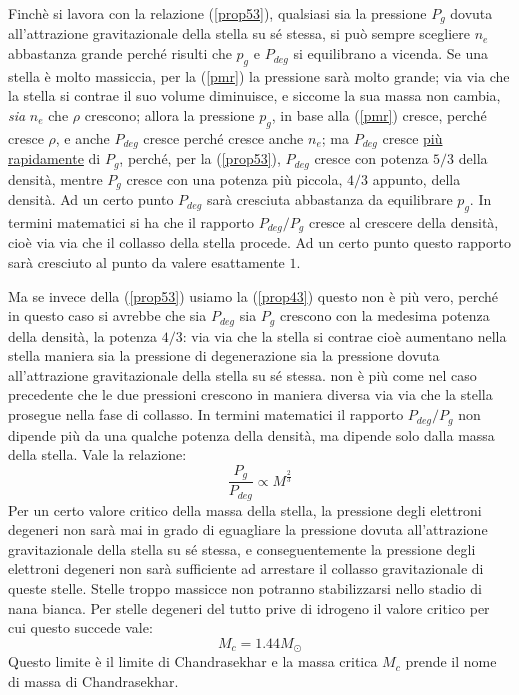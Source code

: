 Finch\`{e} si lavora con la relazione (\ref{prop53}), qualsiasi sia la pressione $P_{g}$ dovuta all'attrazione gravitazionale della stella su s\'{e} stessa, si pu\`{o} sempre scegliere $n_{e}$ abbastanza grande perch\'{e} risulti che $p_{g}$ e $P_{deg}$ si equilibrano a vicenda. Se una stella \`{e} molto massiccia, per la (\ref{pmr}) la pressione sar\`{a} molto grande; via via che la stella si contrae il suo volume diminuisce, e siccome la sua massa non cambia, \emph{sia} $n_{e}$ che $\rho$ crescono; allora la pressione $p_{g}$, in base alla (\ref{pmr}) cresce, perch\'{e} cresce $\rho$, e anche $P_{deg}$ cresce perch\'{e} cresce anche $n_{e}$; ma $P_{deg}$ cresce \underline{pi\`{u} rapidamente} di $P_{g}$, perch\'{e}, per la (\ref{prop53}), $P_{deg}$ cresce con potenza $5/3$ della densit\`{a}, mentre $P_{g}$ cresce con una potenza pi\`{u} piccola, $4/3$ appunto, della densit\`{a}. Ad un certo punto $P_{deg}$ sar\`{a} cresciuta abbastanza da equilibrare $p_{g}$.
In termini matematici si ha che il rapporto $P_{deg}/P_{g}$ cresce al crescere della densit\`{a}, cio\`{e} via via che il collasso della stella procede. Ad un certo punto questo rapporto sar\`{a} cresciuto al punto da valere esattamente $1$.
\par
Ma se invece della (\ref{prop53}) usiamo la (\ref{prop43}) questo non \`{e} pi\`{u} vero, perch\'{e} in questo caso si avrebbe che sia $P_{deg}$ sia $P_{g}$ crescono con la medesima potenza della densit\`{a}, la potenza $4/3$: via via che la stella si contrae cio\`{e} aumentano nella stella maniera sia la pressione di degenerazione sia la pressione dovuta all'attrazione gravitazionale della stella su s\'{e} stessa. non \`{e} pi\`{u} come nel caso precedente che le due pressioni crescono in maniera diversa via via che la stella prosegue nella fase di collasso. In termini matematici il rapporto $P_{deg}/P_{g}$ non dipende pi\`{u} da una qualche potenza della densit\`{a}, ma dipende solo dalla massa della stella. Vale la relazione:
\begin{equation}
\frac{P_{g}}{P_{deg}}\propto M^{\frac{2}{3}}
\end{equation}
Per un certo valore critico della massa della stella, la pressione degli elettroni degeneri non sar\`{a} mai in grado di eguagliare la pressione dovuta all'attrazione gravitazionale della stella su s\'{e} stessa, e conseguentemente la pressione degli elettroni degeneri non sar\`{a} sufficiente ad arrestare il collasso gravitazionale di queste stelle. Stelle troppo massicce non potranno stabilizzarsi nello stadio di nana bianca. Per stelle degeneri del tutto prive di idrogeno il valore critico per cui questo succede vale:
\begin{displaymath}
M_{c} =1.44 M_{\odot}
\end{displaymath}
Questo limite \`{e} il limite di Chandrasekhar e la massa critica $M_{c}$ prende il nome di massa di Chandrasekhar.

